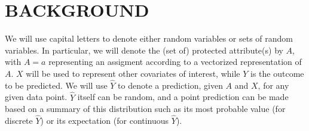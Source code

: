 \section{BACKGROUND}

We will use capital letters to denote either random variables or sets
of random variables. In particular, we will denote the (set of)
protected attribute(s) by $A$, with $A = a$ representing an
assigment according to a vectorized representation of $A$. $X$ will be used
to represent other covariates of interest, while $Y$ is the outcome to
be predicted. We will use $\hat Y$ to denote a prediction, given $A$ and $X$,
for any given data point. $\hat Y$ itself can be random, and a point
prediction can be made based on a summary of this distribution such as its
most probable value (for discrete $\hat Y$) or its expectation (for
continuous $\hat Y$).

